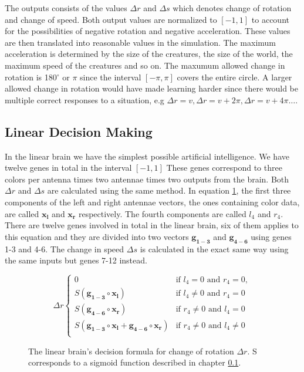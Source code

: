 \documentclass[a4paper,11pt]{kth-mag}
\begin{document}
The outputs consists of the values $\Delta r$ and $\Delta s$ which denotes change of rotation and change of speed. Both output values are normalized to $[-1,1]$ to account for the possibilities of negative rotation and negative acceleration. These values are then translated into reasonable values in the simulation. The maximum acceleration is determined by the size of the creatures, the size of the world, the maximum speed of the creatures and so on. The maxumum allowed change in rotation is 180$^\circ$ or $\pi$ since the interval $[-\pi,\pi]$ covers the entire circle. A larger allowed change in rotation would have made learning harder since there would be multiple correct responses to a situation, e.g $\Delta r = v, \Delta r = v+ 2\pi, \Delta r = v+ 4\pi \dots $.

\subsection{Linear Decision Making}
\label{linear-decision-making}
In the linear brain we have the simplest possible artificial intelligence. We have twelve genes in total in the interval $[-1,1]$ These genes correspond to three colors per antenna times two antennae times two outputs from the brain. Both $\Delta r$ and $\Delta s$ are calculated using the same method. In equation \ref{linear-decide}, the first three components of the left and right antennae vectors, the ones containing color data, are called $\mathbf{x_{l}}$ and $\mathbf{x_{r}}$ respectively. The fourth components are called $l_4$ and $r_4$. There are twelve genes involved in total in the linear brain, six of them applies to this equation and they are divided into two vectors $\mathbf{g_{1-3}}$ and $\mathbf{g_{4-6}}$ using genes 1-3 and 4-6. The change in speed $\Delta s$ is calculated in the exact same way using the same inputs but genes 7-12 instead.


\begin{figure}
\begin{equation}
\Delta r
\begin{cases}
	0 & \text{if $l_4 = 0$ and $r_4 = 0$},\\
	S(\mathbf{g_{1-3}} \circ \mathbf{x_l}) & \text{if $l_4 \neq 0$ and $r_4 = 0$}\\
	S(\mathbf{g_{4-6}} \circ \mathbf{x_r}) & \text{if $r_4 \neq 0$ and $l_4 = 0$}\\
	S(\mathbf{g_{1-3}} \circ \mathbf{x_l} + \mathbf{g_{4-6}} \circ \mathbf{x_r} ) & \text{if $r_4 \neq 0$ and $l_4 \neq 0$}\\
\end{cases}	
\end{equation}
\caption{The linear brain's decision formula for change of rotation $\Delta r$. S corresponds to a sigmoid function described in chapter \ref{linear-decision-making}.}
\label{linear-decide}
\end{figure}
\end{document}
